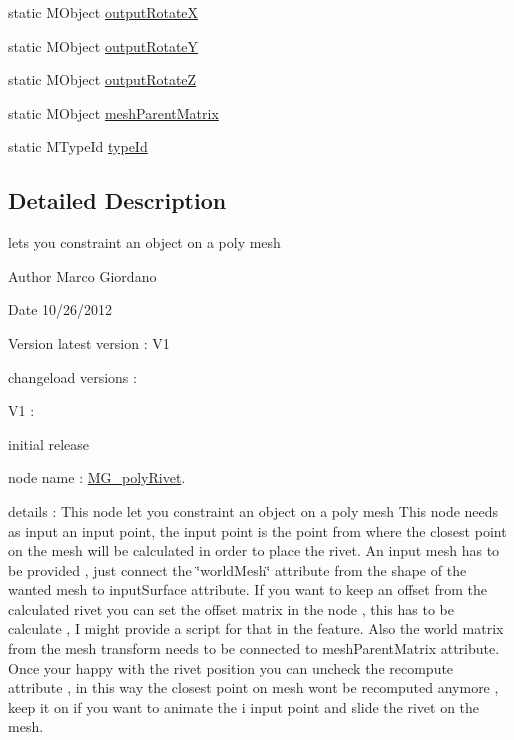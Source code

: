 \begin{DoxyCompactItemize}
static M\-Object \hyperlink{class_m_g__poly_rivet_a56e48fc9050adcabb9554e520335e6ab}{output\-Rotate\-X}
\item 
static M\-Object \hyperlink{class_m_g__poly_rivet_a2668b8ed6265a03068d1b9e52401330b}{output\-Rotate\-Y}
\item 
static M\-Object \hyperlink{class_m_g__poly_rivet_aae095981ed78cd7fddae65b96b2f54fa}{output\-Rotate\-Z}
\item 
static M\-Object \hyperlink{class_m_g__poly_rivet_a922ab768d29ec0c21e3fbdaad23e83ab}{mesh\-Parent\-Matrix}
\item 
static M\-Type\-Id \hyperlink{class_m_g__poly_rivet_ab40d934bc8164246ba36c1e2c96eaa7c}{type\-Id}
\end{DoxyCompactItemize}


\subsection{Detailed Description}
lets you constraint an object on a poly mesh 

\begin{DoxyAuthor}{Author}
Marco Giordano 
\end{DoxyAuthor}
\begin{DoxyDate}{Date}
10/26/2012 
\end{DoxyDate}
\begin{DoxyVersion}{Version}
latest version \-: V1 

changeload versions \-: \par
 V1 \-: \par

\begin{DoxyItemize}
\item initial release \par

\end{DoxyItemize}
\end{DoxyVersion}
node name \-: \hyperlink{class_m_g__poly_rivet}{M\-G\-\_\-poly\-Rivet}.

details \-: This node let you constraint an object on a poly mesh This node needs as input an input point, the input point is the point from where the closest point on the mesh will be calculated in order to place the rivet. An input mesh has to be provided , just connect the \char`\"{}world\-Mesh\char`\"{} attribute from the shape of the wanted mesh to input\-Surface attribute. If you want to keep an offset from the calculated rivet you can set the offset matrix in the node , this has to be calculate , I might provide a script for that in the feature. Also the world matrix from the mesh transform needs to be connected to mesh\-Parent\-Matrix attribute. Once your happy with the rivet position you can uncheck the recompute attribute , in this way the closest point on mesh wont be recomputed anymore , keep it on if you want to animate the i input point and slide the rivet on the mesh.

